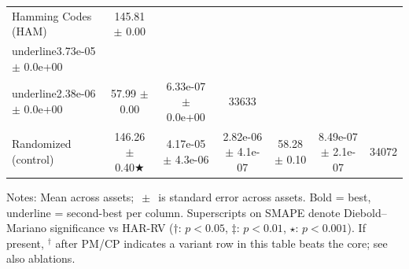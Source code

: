 \begin{table}[t]
\begin{tabular}{lcccccc}
Hamming Codes (HAM) & 145.81 $\pm$ 0.00 & \\underline{3.73e-05 $\pm$ 0.0e+00} & \\underline{2.38e-06 $\pm$ 0.0e+00} & 57.99 $\pm$ 0.00 & 6.33e-07 $\pm$ 0.0e+00 & 33633 \\
Randomized (control) & 146.26 $\pm$ 0.40★ & 4.17e-05 $\pm$ 4.3e-06 & 2.82e-06 $\pm$ 4.1e-07 & 58.28 $\pm$ 0.10 & 8.49e-07 $\pm$ 2.1e-07 & 34072 \\
\bottomrule
\end{tabular}
\vspace{2pt}\par\footnotesize Notes: Mean across assets; $\,\pm\,$ is standard error across assets. Bold = best, underline = second-best per column. Superscripts on SMAPE denote Diebold--Mariano significance vs HAR-RV ($\dagger$: $p<0.05$, $\ddagger$: $p<0.01$, $\star$: $p<0.001$). If present, $^\dagger$ after PM/CP indicates a variant row in this table beats the core; see also ablations.
\end{table}